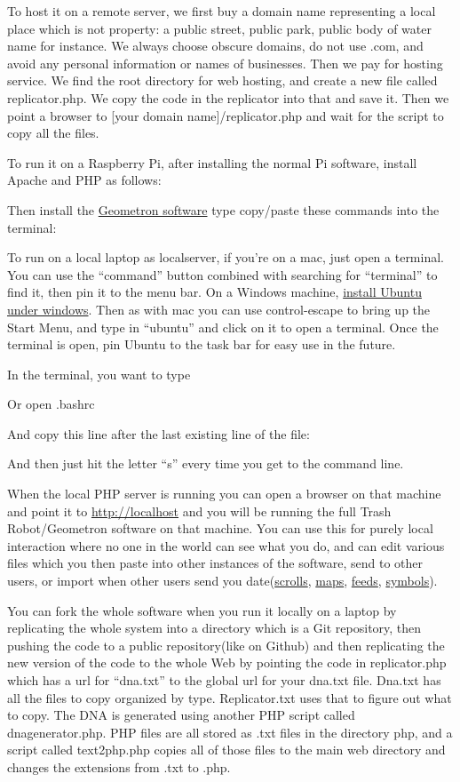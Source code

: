To host it on a remote server, we first buy a domain name representing a
local place which is not property: a public street, public park, public
body of water name for instance. We always choose obscure domains, do
not use .com, and avoid any personal information or names of businesses.
Then we pay for hosting service. We find the root directory for web
hosting, and create a new file called replicator.php. We copy the code
in the replicator into that and save it. Then we point a browser to
{[}your domain name{]}/replicator.php and wait for the script to copy
all the files.

To run it on a Raspberry Pi, after installing the normal Pi software,
install Apache and PHP as follows:

Then install the \href{https://github.com/lafelabs/thing/}{Geometron
software} type copy/paste these commands into the terminal:

To run on a local laptop as localserver, if you're on a mac, just open a
terminal. You can use the ``command'' button combined with searching for
``terminal'' to find it, then pin it to the menu bar. On a Windows
machine,
\href{https://ubuntu.com/tutorials/ubuntu-on-windows\#1-overview}{install
Ubuntu under windows}. Then as with mac you can use control-escape to
bring up the Start Menu, and type in ``ubuntu'' and click on it to open
a terminal. Once the terminal is open, pin Ubuntu to the task bar for
easy use in the future.

In the terminal, you want to type

Or open .bashrc

And copy this line after the last existing line of the file:

And then just hit the letter ``s'' every time you get to the command
line.

When the local PHP server is running you can open a browser on that
machine and point it to \href{http://localhost/}{http://localhost} and
you will be running the full Trash Robot/Geometron software on that
machine. You can use this for purely local interaction where no one in
the world can see what you do, and can edit various files which you then
paste into other instances of the software, send to other users, or
import when other users send you
date(\href{scrolls/scrolls.md}{scrolls}, \href{scrolls/maps.md}{maps},
\href{scrolls/feeds.md}{feeds}, \href{scrolls/geometron.md}{symbols}).

You can fork the whole software when you run it locally on a laptop by
replicating the whole system into a directory which is a Git repository,
then pushing the code to a public repository(like on Github) and then
replicating the new version of the code to the whole Web by pointing the
code in replicator.php which has a url for ``dna.txt'' to the global url
for your dna.txt file. Dna.txt has all the files to copy organized by
type. Replicator.txt uses that to figure out what to copy. The DNA is
generated using another PHP script called dnagenerator.php. PHP files
are all stored as .txt files in the directory php, and a script called
text2php.php copies all of those files to the main web directory and
changes the extensions from .txt to .php.

